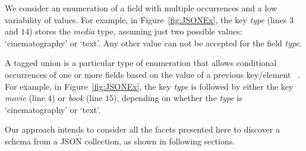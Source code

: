 We consider an enumeration of a field with multiple occurrences and a low variability of values. For example, in Figure~\ref{fig:JSONEx}, the key \textit{type} (lines $3$ and $14$) stores the  \textit{media} type, assuming just two possible values: `cinematography' or `text'. Any other value can not be accepted for the field  \textit{type}.

A tagged union is a particular type of enumeration that allows conditional occurrences of one or more fields based on the value of a previous key/element ~\citep{Sp+21}. For example, in Figure~\ref{fig:JSONEx}, the key \textit{type} is followed by either the key \textit{movie} (line $4$) or \textit{book} (line $15$), depending on whether the \textit{type} is `cinematography' or `text'.

Our approach intends to consider all the facets presented here to discover a schema from a JSON collection, as shown in following sections.
